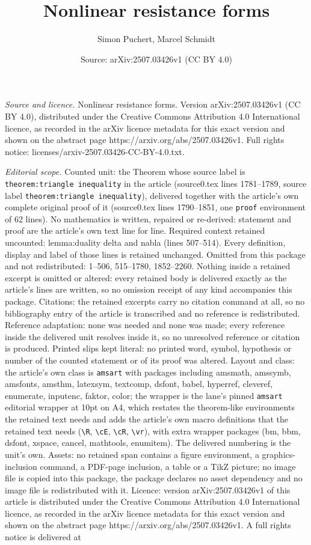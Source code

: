 \documentclass[10pt,a4paper]{amsart}
\title[Nonlinear resistance forms]{Nonlinear resistance forms}
\author{Simon Puchert, Marcel Schmidt}
\date{Source: arXiv:2507.03426v1 (CC BY 4.0)}
\begin{document}
\maketitle

\noindent\emph{Source and licence.} Nonlinear resistance forms. Version arXiv:2507.03426v1 (CC BY 4.0), distributed under the Creative Commons Attribution 4.0 International licence, as recorded in the arXiv licence metadata for this exact version and shown on the abstract page https://arxiv.org/abs/2507.03426v1. Full rights notice: licenses/arxiv-2507.03426-CC-BY-4.0.txt.\par\smallskip

\noindent\textit{Editorial scope.} Counted unit: the Theorem whose source label is \texttt{theorem:triangle inequality} in the article (source0.tex lines 1781--1789, source label \texttt{theorem:triangle inequality}), delivered together with the article's own complete original proof of it (source0.tex lines 1790--1851, one \texttt{proof} environment of 62 lines). No mathematics is written, repaired or re-derived: statement and proof are the article's own text line for line. Required context retained uncounted: lemma:duality delta and nabla (lines 507--514). Every definition, display and label of those lines is retained unchanged. Omitted from this package and not redistributed: 1--506, 515--1780, 1852--2260. Nothing inside a retained excerpt is omitted or altered: every retained body is delivered exactly as the article's lines are written, so no omission receipt of any kind accompanies this package. Citations: the retained excerpts carry no citation command at all, so no bibliography entry of the article is transcribed and no reference is redistributed. Reference adaptation: none was needed and none was made; every reference inside the delivered unit resolves inside it, so no unresolved reference or citation is produced. Printed slips kept literal: no printed word, symbol, hypothesis or number of the counted statement or of its proof was altered. Layout and class: the article's own class is \texttt{amsart} with packages including amsmath, amssymb, amsfonts, amsthm, latexsym, textcomp, dsfont, babel, hyperref, cleveref, enumerate, inputenc, faktor, color; the wrapper is the lane's pinned \texttt{amsart} editorial wrapper at 10pt on A4, which restates the theorem-like environments the retained text needs and adds the article's own macro definitions that the retained text needs (\texttt{\textbackslash R}, \texttt{\textbackslash cE}, \texttt{\textbackslash cR}, \texttt{\textbackslash vr}), with extra wrapper packages (bm, bbm, dsfont, xspace, cancel, mathtools, enumitem). The delivered numbering is the unit's own. Assets: no retained span contains a figure environment, a graphics-inclusion command, a PDF-page inclusion, a table or a TikZ picture; no image file is copied into this package, the package declares no asset dependency and no image file is redistributed with it. Licence: version arXiv:2507.03426v1 of this article is distributed under the Creative Commons Attribution 4.0 International licence, as recorded in the arXiv licence metadata for this exact version and shown on the abstract page https://arxiv.org/abs/2507.03426v1. A full rights notice is delivered at 
\end{document}
